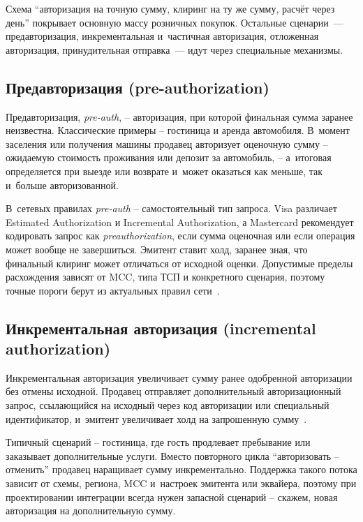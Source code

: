 Схема \enquote{авторизация на точную сумму, клиринг на ту же сумму,
расчёт через день} покрывает основную массу розничных покупок.
Остальные сценарии~--- предавторизация, инкрементальная и~частичная
авторизация, отложенная авторизация, принудительная отправка~---
идут через специальные механизмы.

\subsection*{Предавторизация (pre-authorization)}

Предавторизация, \textit{pre-auth}, -- авторизация, при которой финальная
сумма заранее неизвестна. Классические примеры -- гостиница и
аренда автомобиля. В~момент заселения или получения машины продавец
авторизует оценочную сумму -- ожидаемую стоимость проживания
или депозит за автомобиль, -- а~итоговая определяется при выезде
или возврате и~может оказаться как меньше, так и~больше
авторизованной.

В~сетевых правилах \textit{pre-auth} -- самостоятельный тип запроса. Visa
различает Estimated Authorization и Incremental Authorization,
а Mastercard рекомендует кодировать запрос как \textit{preauthorization},
если сумма оценочная или если операция может вообще не завершиться.
Эмитент ставит холд, заранее зная, что финальный клиринг может
отличаться от исходной оценки. Допустимые пределы расхождения
зависят от MCC, типа ТСП и конкретного сценария, поэтому точные
пороги берут из актуальных правил сети~\cite{visa-tadg,visa-core-rules,mc-tpr}.

\subsection*{Инкрементальная авторизация (incremental authorization)}

Инкрементальная авторизация увеличивает сумму ранее одобренной
авторизации без отмены исходной. Продавец отправляет дополнительный
авторизационный запрос, ссылающийся на исходный через код авторизации
или специальный идентификатор, и~эмитент увеличивает холд
на запрошенную сумму~\cite{visa-tadg,visa-core-rules,mc-tpr}.

Типичный сценарий -- гостиница, где гость продлевает пребывание
или заказывает дополнительные услуги. Вместо повторного цикла
\enquote{авторизовать -- отменить} продавец наращивает сумму
инкрементально. Поддержка такого потока зависит от схемы, региона,
MCC и~настроек эмитента или эквайера, поэтому при проектировании
интеграции всегда нужен запасной сценарий -- скажем, новая
авторизация на дополнительную сумму.

